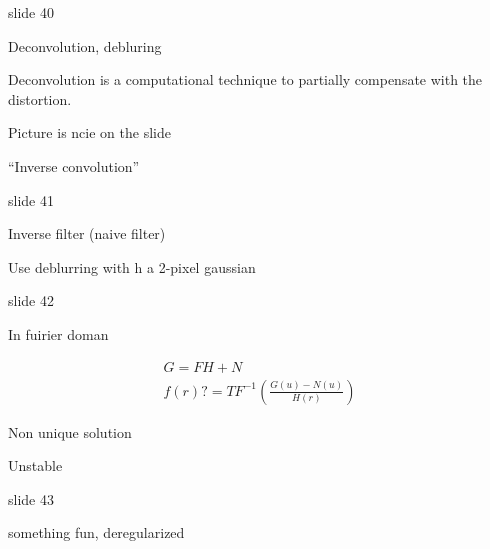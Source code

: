 \documentclass[../main/main.tex]{subfiles}
\begin{document}
slide 40

Deconvolution, debluring

Deconvolution is a computational technique to partially compensate with the distortion.

Picture is ncie on the slide

``Inverse convolution''

slide 41

Inverse filter (naive filter)

Use deblurring with  h a 2-pixel gaussian

slide 42

In fuirier doman

\begin{align}
G = FH + N\\

f(r)? = TF^{-1}\left(\frac{G(u)- N(u)}{H(r)}\right)
\end{align}

Non unique solution

Unstable

slide 43

something fun, deregularized
\end{document}
